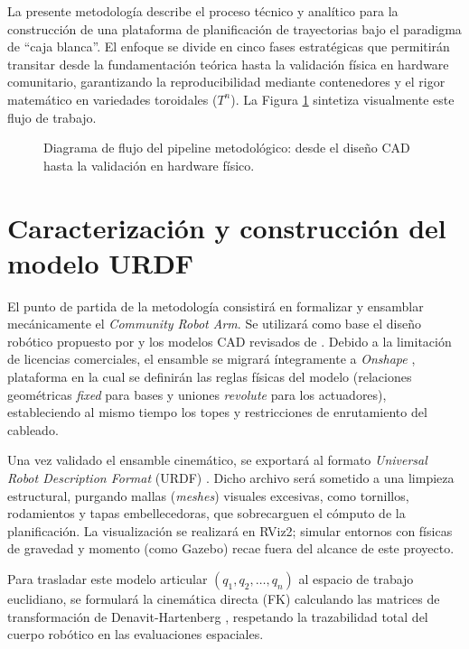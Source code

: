 La presente metodología describe el proceso técnico y analítico para la construcción de una plataforma de planificación de trayectorias bajo el paradigma de \enquote{caja blanca}. El enfoque se divide en cinco fases estratégicas que permitirán transitar desde la fundamentación teórica hasta la validación física en hardware comunitario, garantizando la reproducibilidad mediante contenedores y el rigor matemático en variedades toroidales ($T^n$). La Figura \ref{fig:pipeline_metodologia} sintetiza visualmente este flujo de trabajo.

\begin{figure}[htbp]
    \centering
    

    \caption{Diagrama de flujo del pipeline metodológico: desde el diseño CAD hasta la validación en hardware físico.}
    \label{fig:pipeline_metodologia}
\end{figure}

\section{Caracterización y construcción del modelo URDF}
El punto de partida de la metodología consistirá en formalizar y ensamblar mecánicamente el \textit{Community Robot Arm}. Se utilizará como base el diseño robótico propuesto por \parencite{community_robot_arm_20sffactory} y los modelos CAD revisados de \parencite{grabcad_robot_arm_2026}. Debido a la limitación de licencias comerciales, el ensamble se migrará íntegramente a \textit{Onshape} \parencite{onshape_cad}, plataforma en la cual se definirán las reglas físicas del modelo (relaciones geométricas \textit{fixed} para bases y uniones \textit{revolute} para los actuadores), estableciendo al mismo tiempo los topes y restricciones de enrutamiento del cableado.

Una vez validado el ensamble cinemático, se exportará al formato \textit{Universal Robot Description Format} (URDF) \parencite{ros_urdf_wiki}. Dicho archivo será sometido a una limpieza estructural, purgando mallas (\textit{meshes}) visuales excesivas, como tornillos, rodamientos y tapas embellecedoras, que sobrecarguen el cómputo de la planificación. La visualización se realizará en RViz2; simular entornos con físicas de gravedad y momento (como Gazebo) recae fuera del alcance de este proyecto.

Para trasladar este modelo articular $(q_1, q_2, \dots, q_n)$ al espacio de trabajo euclidiano, se formulará la cinemática directa (FK) calculando las matrices de transformación de Denavit-Hartenberg \parencite{spong2020robot}, respetando la trazabilidad total del cuerpo robótico en las evaluaciones espaciales.

